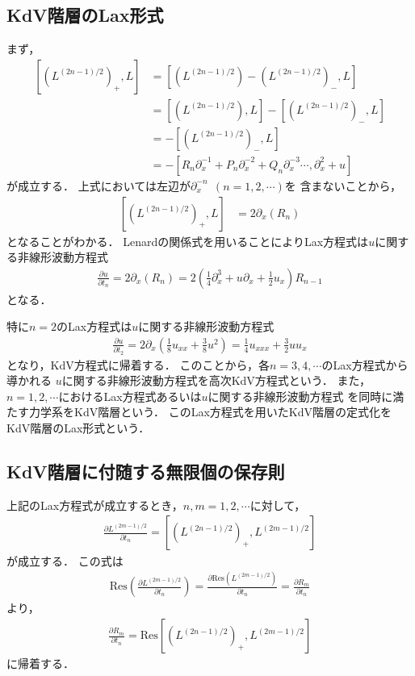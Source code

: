 \documentclass[dvipdfmx,12pt,a4paper,uplatex]{jsarticle}
\theoremstyle{plain}
\theoremstyle{definition}
\begin{document}
\subsection{KdV階層のLax形式}
まず，
\begin{align}
\left[\left(L^{(2n-1)/2}\right)_+,L\right]
&=
\left[\left(L^{(2n-1)/2}\right)-\left(L^{(2n-1)/2}\right)_-,L\right]
\nonumber \\
&=
\left[\left(L^{(2n-1)/2}\right),L\right]
-\left[\left(L^{(2n-1)/2}\right)_-,L\right] \nonumber\\
&=
-\left[\left(L^{(2n-1)/2}\right)_-,L\right] \nonumber \\
&=
-\left[R_{n}\partial_x^{-1} + P_n\partial_x^{-2}+ Q_n\partial_x^{-3}
\cdots
,\partial_x^2 + u\right] 
\end{align}
が成立する．
上式においては左辺が$\partial_{x}^{-n} \ \ (n=1,2,\cdots)$を
含まないことから，
\begin{align}
\left[\left(L^{(2n-1)/2}\right)_+,L\right]
&=
2\partial_x(R_n)
\end{align}
となることがわかる．
Lenardの関係式を用いることによりLax方程式は$u$に関する非線形波動方程式
\begin{align}
\frac{\partial u}{\partial t_n} 
= 2\partial_x(R_n)
= 2\left(\frac14 \partial_x^3 + u\partial_x + \frac12 u_x \right)
R_{n-1}
\end{align}
となる．

特に$n=2$のLax方程式は$u$に関する非線形波動方程式
\begin{align}
\frac{\partial u}{\partial t_2} 
=
2\partial_x \left(\frac{1}{8}u_{xx} +\frac{3}{8}u^2 \right)
= \frac{1}{4}u_{xxx} + \frac{3}{2}uu_x
\end{align}
となり，KdV方程式に帰着する．
このことから，各$n=3,4,\cdots$のLax方程式から導かれる
$u$に関する非線形波動方程式を高次KdV方程式という．
また，$n=1,2,\cdots$におけるLax方程式あるいは$u$に関する非線形波動方程式
を同時に満たす力学系をKdV階層という．
このLax方程式を用いたKdV階層の定式化をKdV階層のLax形式という．

\subsection{KdV階層に付随する無限個の保存則}
上記のLax方程式が成立するとき，$n,m=1,2,\cdots$に対して，
\begin{align}
\frac{\partial L^{(2m-1)/2}}{\partial t_n} = 
\left[\left(L^{(2n-1)/2}\right)_+,L^{(2m-1)/2}\right]
\end{align}
が成立する．
この式は
\begin{align}
\mathrm{Res}\left(\frac{\partial L^{(2m-1)/2}}{\partial t_n}\right)
=
\frac{\partial \mathrm{Res}\left(L^{(2m-1)/2}\right)}{\partial t_n}
=
\frac{\partial R_m}{\partial t_n}
\end{align}
より，
\begin{align}
\frac{\partial R_m}{\partial t_n} 
= 
\mathrm{Res}\left[\left(L^{(2n-1)/2}\right)_+,L^{(2m-1)/2}\right]
\end{align}
に帰着する．
\end{document}
